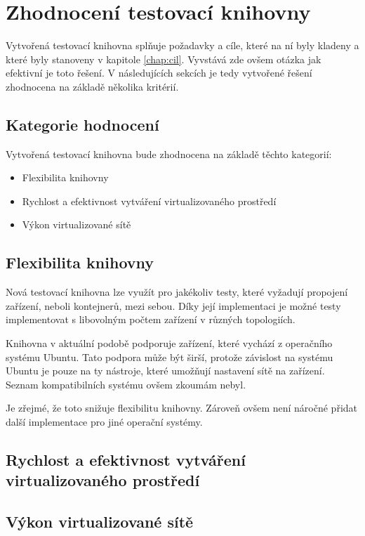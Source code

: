 \chapter{Zhodnocení testovací knihovny}\label{chap:review}

Vytvořená testovací knihovna splňuje požadavky a cíle, které na ní byly kladeny a které byly stanoveny v kapitole \ref{chap:cil}. Vyvstává zde ovšem otázka jak efektivní je toto řešení. V následujících sekcích je tedy vytvořené řešení zhodnocena na základě několika kritérií.

\section{Kategorie hodnocení}

Vytvořená testovací knihovna bude zhodnocena na základě těchto kategorií:

\begin{itemize}
    \item Flexibilita knihovny
    \item Rychlost a efektivnost vytváření virtualizovaného prostředí
    \item Výkon virtualizované sítě
\end{itemize}


\section{Flexibilita knihovny}
Nová testovací knihovna lze využít pro jakékoliv testy, které vyžadují propojení zařízení, neboli kontejnerů, mezi sebou. Díky její implementaci je možné testy implementovat s libovolným počtem zařízení v různých topologiích.

Knihovna v aktuální podobě podporuje zařízení, které vychází z operačního systému Ubuntu. Tato podpora může být širší, protože závislost na systému Ubuntu je pouze na ty nástroje, které umožňují nastavení sítě na zařízení. Seznam kompatibilních systému ovšem zkoumám nebyl. 

Je zřejmé, že toto snižuje flexibilitu knihovny. Zároveň ovšem není náročné přidat další implementace pro jiné operační systémy. 

\section{Rychlost a efektivnost vytváření virtualizovaného prostředí}




\section{Výkon virtualizované sítě}

